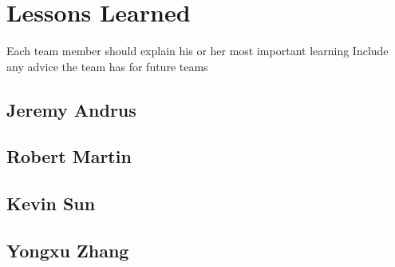 \chapter{Lessons Learned}

Each team member should explain his or her most important learning
Include any advice the team has for future teams

\section{Jeremy Andrus}


\section{Robert Martin}


\section{Kevin Sun}


\section{Yongxu Zhang}


